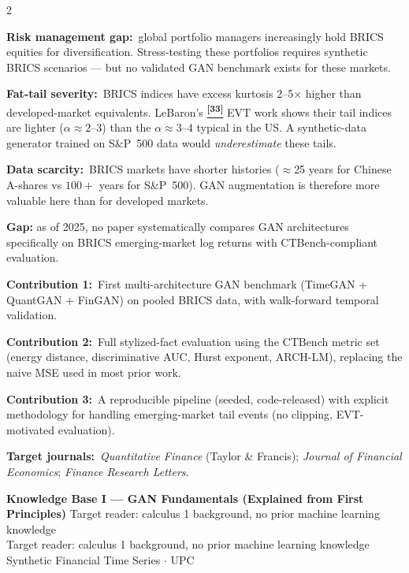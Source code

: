 \documentclass[10pt]{article}
\newcommand{\greenbox}[2]{\begin{tcolorbox}[mybox={FGreen}{GBg},title={#1}]#2\end{tcolorbox}}
\newcommand{\redbox}[2]{\begin{tcolorbox}[mybox={DRed}{RBg},title={#1}]#2\end{tcolorbox}}
\newcommand{\pagehead}[2]{%
  \begin{tcolorbox}[enhanced,arc=0pt,outer arc=0pt,boxrule=0pt,
    colback=Navy,colframe=Navy,
    top=5pt,bottom=5pt,left=8pt,right=8pt,
    before skip=0pt,after skip=10pt]
  {\color{white}\large\bfseries #1}%
  \ifx\relax#2\relax\else\\[1pt]{\color{blue!30!white}\small #2}\fi
  \hfill{\color{blue!20!white}\footnotesize Synthetic Financial Time Series $\cdot$ UPC}
  \end{tcolorbox}}
\newcommand{\tcite}[1]{%
  \hyperlink{R:#1}{\textsuperscript{\scriptsize\textbf{[#1]}}}}
\begin{document}
\begin{multicols}{2}
\columnbreak

\greenbox{Why BRICS? The Scientific Motivation}{%
\textbf{Risk management gap:}\ global portfolio managers increasingly hold BRICS equities for diversification. Stress-testing these portfolios requires synthetic BRICS scenarios --- but no validated GAN benchmark exists for these markets.

\smallskip
\textbf{Fat-tail severity:}\ BRICS indices have excess kurtosis 2--5$\times$ higher than developed-market equivalents. LeBaron's\tcite{33} EVT work shows their tail indices are lighter ($\alpha \approx 2$--$3$) than the $\alpha \approx 3$--$4$ typical in the US. A synthetic-data generator trained on S\&P~500 data would \emph{underestimate} these tails.

\smallskip
\textbf{Data scarcity:}\ BRICS markets have shorter histories ($\approx$25 years for Chinese A-shares vs $100+$ years for S\&P~500). GAN augmentation is therefore more valuable here than for developed markets.}

\redbox{Why This Study Is Publishable: The Journal Pitch}{%
\textbf{Gap:} as of 2025, no paper systematically compares GAN architectures specifically on BRICS emerging-market log returns with CTBench-compliant evaluation.

\textbf{Contribution 1:}\ First multi-architecture GAN benchmark (TimeGAN + QuantGAN + FinGAN) on pooled BRICS data, with walk-forward temporal validation.

\textbf{Contribution 2:}\ Full stylized-fact evaluation using the CTBench metric set (energy distance, discriminative AUC, Hurst exponent, ARCH-LM), replacing the naive MSE used in most prior work.

\textbf{Contribution 3:}\ A reproducible pipeline (seeded, code-released) with explicit methodology for handling emerging-market tail events (no clipping, EVT-motivated evaluation).

\textbf{Target journals:}\ \textit{Quantitative Finance} (Taylor \& Francis); \textit{Journal of Financial Economics}; \textit{Finance Research Letters}.}

\end{multicols}

\clearpage

\pagehead{Knowledge Base I --- GAN Fundamentals (Explained from First Principles)}
         {Target reader: calculus 1 background, no prior machine learning knowledge}
\end{document}
